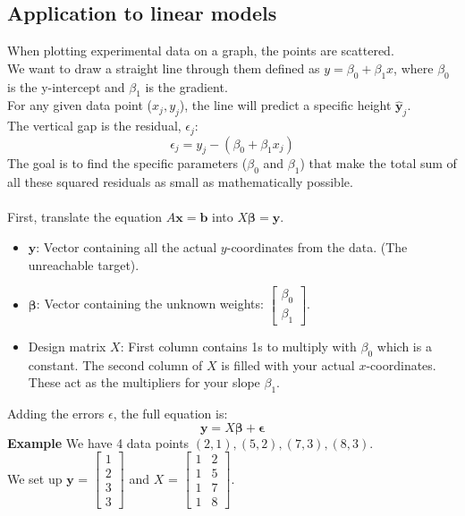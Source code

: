\documentclass[../linear-algebra.tex]{subfiles}
\begin{document}
\subsection{Application to linear models}
When plotting experimental data on a graph, the points are scattered.\\
We want to draw a straight line through them defined as $y = \beta_0 + \beta_1x$, where $\beta_0$ is the y-intercept and $\beta_1$ is the gradient.\\
For any given data point ($x_j, y_j$), the line will predict a specific height $\mathbf{\hat{y}}_j$.\\
The vertical gap is the residual, $\epsilon_j$:
$$\epsilon_j = y_j - (\beta_0 + \beta_1x_j)$$
The goal is to find the specific parameters ($\beta_0$ and $\beta_1$) that make the total sum of all these squared residuals as small as mathematically possible.\\
\\
First, translate the equation $A\mathbf{x}=\mathbf{b}$ into $X\mathbf{\beta} = \mathbf{y}$.
\begin{itemize}
    \item $\mathbf{y}$: Vector containing all the actual $y$-coordinates from the data. (The unreachable target).
    \item $\mathbf{\beta}$: Vector containing the unknown weights: $\begin{bmatrix} \beta_0 \\ \beta_1 \end{bmatrix}$.
    \item Design matrix $X$: First column contains 1s to multiply with $\beta_0$ which is a constant.
    The second column of $X$ is filled with your actual $x$-coordinates. These act as the multipliers for your slope $\beta_1$.
\end{itemize}
Adding the errors $\epsilon$, the full equation is:
$$\mathbf{y} = X\mathbf{\beta} + \mathbf{\epsilon}$$
\textbf{Example} We have 4 data points $(2, 1), (5, 2), (7, 3), (8, 3)$.\\
We set up $\mathbf{y}$ = $\begin{bmatrix} 1 \\ 2 \\ 3 \\ 3 \end{bmatrix}$ and $X$ = $\begin{bmatrix} 1 & 2 \\ 1 & 5 \\ 1 & 7 \\ 1 & 8 \end{bmatrix}$.
\end{document}
